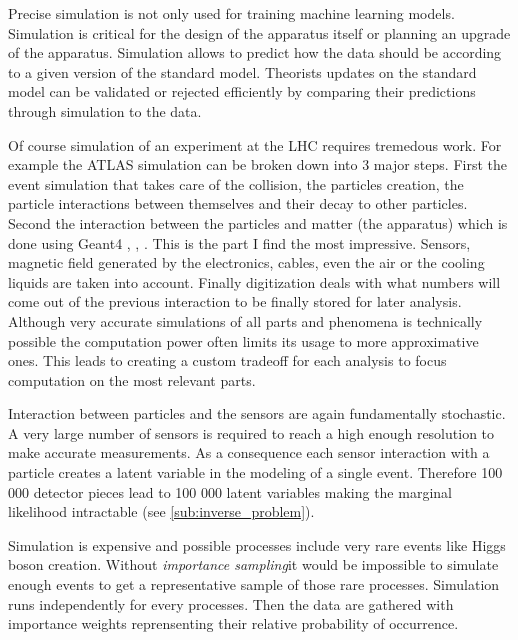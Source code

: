 Precise simulation is not only used for training machine learning models.
Simulation is critical for the design of the apparatus itself or planning an upgrade of the apparatus.
Simulation allows to predict how the data should be according to a given version of the standard model.
Theorists updates on the standard model can be validated or rejected efficiently by comparing their predictions through simulation to the data.

Of course simulation of an experiment at the LHC requires tremedous work.
For example the ATLAS simulation \cite{Aad_2010} can be broken down into 3 major steps.
First the event simulation that takes care of the collision, the particles creation, the particle interactions between themselves and their decay to other particles.
Second the interaction between the particles and matter (the apparatus) which is done using Geant4 \cite{AGOSTINELLI2003250}, \cite{1610988}, \cite{ALLISON2016186}.
This is the part I find the most impressive.
Sensors, magnetic field generated by the electronics, cables, even the air or the cooling liquids are taken into account.
Finally digitization deals with what numbers will come out of the previous interaction to be finally stored for later analysis.
Although very accurate simulations of all parts and phenomena is technically possible the computation power often limits its usage to more approximative ones. 
This leads to creating a custom tradeoff for each analysis to focus computation on the most relevant parts.

Interaction between particles and the sensors are again fundamentally stochastic.
A very large number of sensors is required to reach a high enough resolution to make accurate measurements.
As a consequence each sensor interaction with a particle creates a latent variable in the modeling of a single event.
Therefore 100 000 detector pieces lead to 100 000 latent variables making the marginal likelihood intractable (see \autoref{sub:inverse_problem}).

Simulation is expensive and possible processes include very rare events like Higgs boson creation.
Without \emph{importance sampling}\needcite it would be impossible to simulate enough events to get a representative sample of those rare processes.
Simulation runs independently for every processes.
Then the data are gathered with importance weights reprensenting their relative probability of occurrence.








